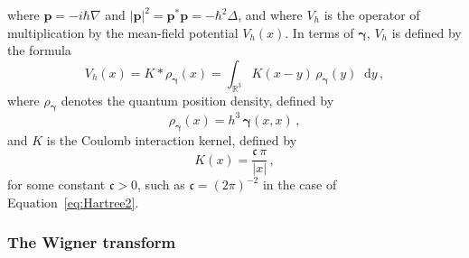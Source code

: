 \documentclass[a4paper,12pt]{amsart} %
\theoremstyle{plain}
\theoremstyle{definition}
\newcommand		{\RR}		{\mathbb R}			%
\newcommand		{\R}		{\RR}
\newcommand		{\Rd}		{\R^3}
\newcommand		{\hd}		{h^3}
\newcommand		{\lt}			{\left}				%
\newcommand		{\rt}			{\right}			%
\renewcommand	{\(}			{\lt(}
\renewcommand	{\)}			{\rt)}
\newcommand		{\n}[1]			{\lt\lvert{#1}\rt\rvert}	%
\renewcommand		{\d}		{\mathop{}\!\mathrm{d}}		%
\newcommand		{\intd}			{\int_{\Rd}}
\newcommand	{\h}			{h}
\newcommand		{\opgam}		{{\boldsymbol{\gamma}}}
\newcommand		{\op}			{\opgam}	%
\newcommand		{\opp}			{\boldsymbol{p}}
\newcommand		{\CK}			{\mathfrak{c}}	%
\begin{document}
	where $\opp = -i\hbar\nabla$ and $\n{\opp}^2 = \opp^*\opp = -\hbar^2\Delta$, and where $V_\h$ is the operator of multiplication by the mean-field potential $V_\h(x)$. In terms of $\op$, $V_\h$ is defined by the formula
	\begin{equation}\label{eq:potential_quantum}
		V_\h(x) = K * \rho_\op(x) = \intd K(x-y)\, \rho_\op(y) \d y \, ,
	\end{equation}
	where $\rho_\op$ denotes the quantum position density, defined by
	\begin{equation*}
		\rho_\op(x) = \hd\, \op(x,x) \, ,
	\end{equation*}
	and $K$ is the Coulomb interaction kernel, defined by
	\begin{equation*}
		K(x) = \frac{\CK\,\pi}{\n{x}} \, ,
	\end{equation*}
	for some constant $\CK>0$, such as $\CK = (2\pi)^{-2}$ in the case of Equation~\eqref{eq:Hartree2}.

\subsubsection{The Wigner transform}
\end{document}
